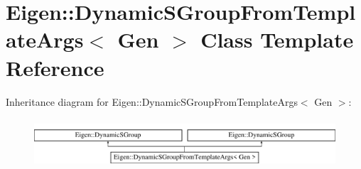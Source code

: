 \hypertarget{class_eigen_1_1_dynamic_s_group_from_template_args}{}\section{Eigen\+:\+:Dynamic\+S\+Group\+From\+Template\+Args$<$ Gen $>$ Class Template Reference}
\label{class_eigen_1_1_dynamic_s_group_from_template_args}
Inheritance diagram for Eigen\+:\+:Dynamic\+S\+Group\+From\+Template\+Args$<$ Gen $>$\+:\begin{figure}[H]
\begin{center}
\leavevmode
\includegraphics[height=1.848185cm]{class_eigen_1_1_dynamic_s_group_from_template_args}
\end{center}
\end{figure}
